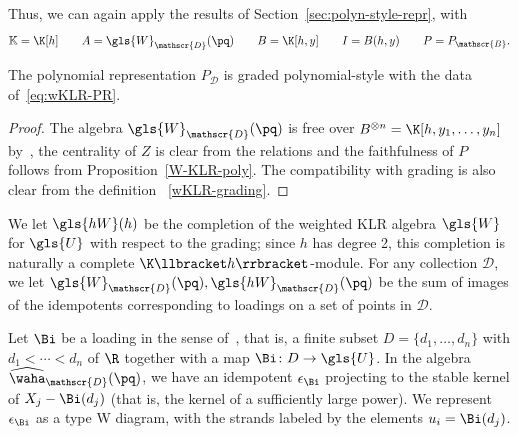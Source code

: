 Thus, we can again apply the results of Section~\ref{sec:polyn-style-repr},
with 
\begin{equation}
\mathbb{K}=\K[h]\qquad A=\gls{W}_{\mathscr{D}}(\pq) \qquad
 B=\K[h,y]\qquad I=B(h,y)\qquad P=P_{\mathscr{B}}.\label{eq:wKLR-PR}
\end{equation}

\begin{lemma}
 The polynomial representation $P_{\mathscr{D}}$ is graded polynomial-style
 with the data of~\eqref{eq:wKLR-PR}. 
\end{lemma}
\begin{proof}
 The algebra $\gls{W}_{\mathscr{D}}(\pq) $ is free over $B^{\otimes
 n}=\K[h,y_1,\dots, y_n]$ by~\cite[Thm.~2.8]{WebwKLR}, the
 centrality of $Z$ is clear from the relations and the faithfulness
 of $P$ follows from Proposition~\ref{W-KLR-poly}. The compatibility
 with grading is also clear from the definition
~\eqref{wKLR-grading}. 
\end{proof}

\begin{defi}\label{def:hW}
We let $\gls{hW}(h)$ be the completion of the weighted KLR algebra
$\gls{W}$ for $\gls{U}$
with respect to the grading; since $h$ has degree 2, this completion
is naturally a complete $\K\llbracket h\rrbracket $-module. For any collection $\mathscr{D}$, we let
$\gls{W}_{\mathscr{D}}(\pq),\gls{hW}_{\mathscr{D}}(\pq)$ be the sum of images of
the idempotents corresponding to loadings on a set of points in $\mathscr{D}$.
\end{defi} 

Let $\Bi$ be a loading in
the sense of~\cite{WebwKLR}, that is, a finite subset $D=\{d_1,\dots, d_n\}$ with
$d_1<\cdots <d_n$ of $\R$
together with a map $\Bi\colon D\to \gls{U}$.
In the algebra $\widehat{\waha}_{\mathscr{D}}(\pq)$, we have an idempotent
$\epsilon_{\Bi}$ projecting to the stable kernel of $X_j-\Bi(d_j)$
(that is, the kernel of a sufficiently large power). 
We represent $\epsilon_{\Bi}$ as a type W
diagram, with the strands labeled by the elements
$u_i=\Bi(d_j)$. 

